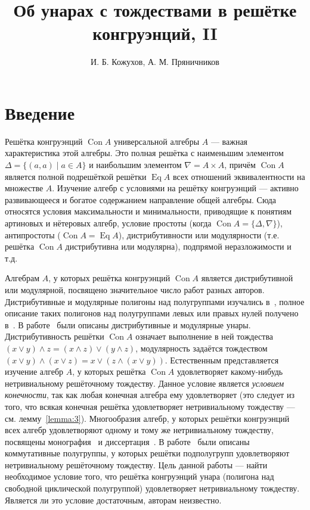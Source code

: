 \documentclass[11pt,twoside,final
]{article}
\title
{%
Об унарах с тождествами в решётке конгруэнций, II}
{%
On unars with identities in congruence lattice, II}
\author
{%
И. Б. Кожухов, А. М. Пряничников}
{%
I. B. Kozhukhov, A. M. Pryanichnikov}
\def\Con{\operatorname{Con}}
\def\Eq{\operatorname{Eq}}
\begin{document}
\maketitle

\enmaketitle

\section{Введение}

Решётка конгруэнций $\Con A$ универсальной алгебры $A$ — важная характеристика этой алгебры.
Это полная решётка с наименьшим элементом $\Delta = \{ (a,a) \mid a \in A \}$ и наибольшим элементом $\nabla = A \times A$, причём $\Con A$ является полной подрешёткой решётки $\Eq A$ всех отношений эквивалентности на множестве $A$.
Изучение алгебр с условиями на решётку конгруэнций — активно развивающееся и богатое содержанием направление общей алгебры.
Сюда относятся условия максимальности и минимальности, приводящие к понятиям артиновых и нётеровых алгебр, условие простоты (когда $\Con A = \{ \Delta, \nabla \}$), антипростоты ($\Con A = \Eq A$), дистрибутивности или модулярности (т.е. решётка $\Con A$ дистрибутивна или модулярна), подпрямой неразложимости и т.д.

Алгебрам $A$, у которых решётка конгруэнций $\Con A$ является дистрибутивной или модулярной, посвящено значительное число работ разных авторов.
Дистрибутивные и модулярные полигоны над полугруппами изучались в~\cite{Ptakhov_2}, полное описание таких полигонов над полугруппами левых или правых нулей получено в~\cite{Khaliullina_3}.
В работе~\cite{Egorova_4} были описаны дистрибутивные и модулярные унары.
Дистрибутивность решётки $\Con A$ означает выполнение в ней тождества $ (x \vee y) \wedge z = (x \wedge z) \vee (y \wedge z) $, модулярность задаётся тождеством $ (x \vee y) \wedge (x \vee z) = x \vee (z \wedge (x \vee y)) $.
Естественным представляется изучение алгебр $A$, у которых решётка $\Con A$ удовлетворяет какому-нибудь нетривиальному решёточному тождеству.
Данное условие является \textit{условием конечности}, так как любая конечная алгебра ему удовлетворяет (это следует из того, что всякая конечная решётка удовлетворяет нетривиальному тождеству — см. лемму~\ref{lemma:3}).
Многообразия алгебр, у которых решётки конгруэнций всех алгебр удовлетворяют одному и тому же нетривиальному тождеству, посвящены монография~\cite{Kearnes_5} и диссертация~\cite{Nation_6}.
В работе~\cite{Repnitsky_7} были описаны коммутативные полугруппы, у которых решётки подполугрупп удовлетворяют нетривиальному решёточному тождеству.
Цель данной работы — найти необходимое условие того, что решётка конгруэнций унара (полигона над свободной циклической полугруппой) удовлетворяет нетривиальному тождеству.
Является ли это условие достаточным, авторам неизвестно.
\end{document}
